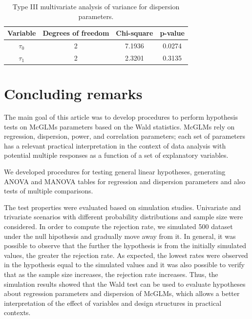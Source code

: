 \documentclass[AMA,STIX1COL]{WileyNJD-v2}
\begin{document}
\begin{table}[h]
\centering
\begin{tabular}{cccc}
\hline
Variable               & Degrees of freedom & Chi-square & p-value        \\ \hline
$\tau_0$ & 2                  & 7.1936       & 0.0274  \\
$\tau_1$ & 2                  & 2.3201       & 0.3135         \\ \hline
\end{tabular}
\caption{Type III multivariate analysis of variance for dispersion parameters.}
\label{tab8}
\end{table}


\section{Concluding remarks}\label{sec7}

The main goal of this article was to develop procedures to perform hypothesis tests on McGLMs parameters based on the Wald statistics. McGLMs rely on regression, dispersion, power, and correlation parameters; each set of parameters has a relevant practical interpretation in the context of data analysis with potential multiple responses as a function of a set of explanatory variables.

We developed procedures for testing general linear hypotheses, generating ANOVA and MANOVA tables for regression and dispersion parameters and also tests of multiple comparisons.

The test properties were evaluated based on simulation studies. Univariate and trivariate scenarios with different probability distributions and sample size were considered.
In order to compute the rejection rate, we simulated 500 dataset under the null hipothesis and gradually move away from it. 
In general, it was possible to observe that the further the hypothesis is from the initially simulated values, the greater the rejection rate. 
As expected, the lowest rates were observed in the hypothesis equal to the simulated values and it was also possible to verify that as the sample size increases, 
the rejection rate increases. Thus, the simulation results showed that the Wald test can be used to evaluate hypotheses about regression parameters and dispersion of McGLMs, 
which allows a better interpretation of the effect of variables and design structures in practical contexts.
\end{document}
